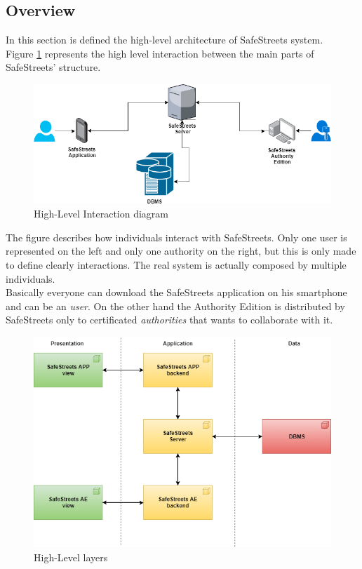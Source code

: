 \documentclass{article}
\begin{document}
		\subsection{Overview}
		In this section is defined the high-level architecture of SafeStreets system.\\ 
		Figure \ref{fig:hinteraction_diagram} represents the high level interaction between the main parts of SafeStreets' structure.
		\begin{figure}[H]
			\includegraphics [scale=0.5] {diagrams/high-interaction.png}
			\caption[High-Level Interaction]{High-Level Interaction diagram}
			\label{fig:hinteraction_diagram}
		\end{figure}
		The figure describes how individuals interact with SafeStreets. Only one user is represented on the left and only one authority on the right, but this is only made to define clearly interactions. The real system is actually composed by multiple individuals.\\
		Basically everyone can download the SafeStreets application on his smartphone and can be an \textit{user}. On the other hand the Authority Edition is distributed by SafeStreets only to certificated \textit{authorities} that wants to collaborate with it. 
		\begin{figure}[H]
			\includegraphics [scale=0.5] {diagrams/system_overview.png}
			\caption[High-Level Layers]{High-Level layers}
			\label{fig:hlayers}
		\end{figure}
\end{document}
